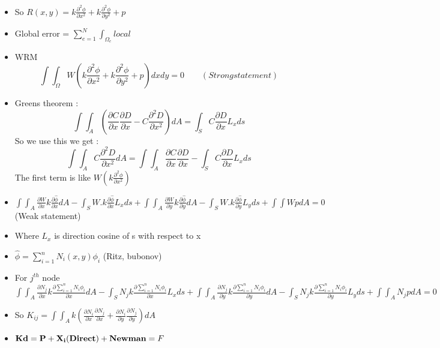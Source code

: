 	
	\begin{frame}
		\begin{itemize}
			\item So $R(x,y) = k \frac{\partial^2 \phi}{\partial x^2} + k \frac{\partial^2 \phi}{\partial y^2} + p$
			\item Global error  =  $\sum_{e=1}^N  \int_{\Omega_e}local$
			\item WRM 
			\begin{equation}
				\int \int_{\Omega} W   \left( k \frac{\partial^2 \phi}{\partial x^2} + k \frac{\partial^2 \phi}{\partial y^2} + p \right) dx dy = 0  \qquad( Strong statement)
			\end{equation}
			\item Greens theorem : 
			\begin{equation}
				\int \int_A \left( \frac{\partial C}{\partial x} \frac{\partial D}{\partial x} - C \frac{\partial^2 D}{\partial x^2} \right) dA =  \int_S C \frac{\partial  D}{\partial x} L_x ds
			\end{equation}
			So we use this we get :
			\begin{equation}
				\int \int_A C \frac{\partial^2 D}{\partial x^2}  dA =  
				\int \int_A \frac{\partial C}{\partial x} \frac{\partial D}{\partial x} - 
				\int_S C \frac{\partial  D}{\partial x} L_x ds
			\end{equation}
			The first term is like $W(k \frac{\partial^2 \phi}{\partial x^2})$
		\end{itemize}
	\end{frame}


	\begin{frame}
		\begin{itemize}
			\item $\int \int_A  \frac{\partial W}{\partial x} k\frac{\partial \hat{\phi}}{\partial x} dA - \int_S W.k \frac{\partial \hat{\phi}}{\partial x} L_x ds + \int \int_A  \frac{\partial W}{\partial y} k\frac{\partial \hat{\phi}}{\partial y} dA - \int_S W.k \frac{\partial \hat{\phi}}{\partial y} L_y ds + \int \int W p dA = 0 $ (Weak statement)
			\item Where $L_x$ is direction cosine of s with respect to x
			\item $\hat{\phi} = \sum_{i=1}^{n}N_i(x,y)\phi_i$ (Ritz, bubonov)
			\item For $j^{th}$ node \\             $\int\int _A \frac{\partial N_j}{\partial x} k \frac{\partial \sum_{i=1}^{n} N_i \phi_i}{\partial x} dA - \int_S N_j k \frac{\partial \sum_{i=1}^{n} N_i \phi_i}{\partial x} L_x ds +
			\int\int _A \frac{\partial N_j}{\partial y} k \frac{\partial \sum_{i=1}^{n} N_i \phi_i}{\partial y} dA - \int_S N_j k \frac{\partial \sum_{i=1}^{n} N_i \phi_i}{\partial y} L_y ds + \int \int_A N_j p dA= 0 $
			\item So $K_{ij} = \int\int_A k \left( \frac{\partial N_i}{\partial x}\frac{\partial N_j}{\partial x} + \frac{\partial N_i}{\partial y}\frac{\partial N_j}{\partial y}\right)dA$
			\item $\mathbf{K  d= P + X_i (Direct)+ Newman } = F$	
	\end{itemize}
	\end{frame}



